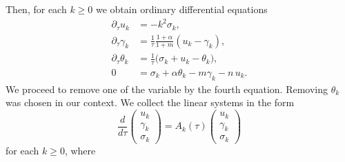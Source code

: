 \documentclass[a4paper,11pt]{article}
\theoremstyle{remark}
\begin{document}
Then, for each $k\ge0$ we obtain ordinary differential equations
\begin{equation} \label{eq:l-system}
 \begin{aligned}
  \partial_\tau u_k &= -k^2 \sigma_k,\\
  \partial_\tau\gamma_k &= \frac{1}{\tau}\frac{1+\alpha}{1+m}(u_k-\gamma_k),\\
  \partial_\tau\theta_k &= \frac{1}{\tau}\Big(\sigma_k+ u_k -\theta_k\Big),\\%
  0&=\sigma_k + \alpha\theta_k -m\gamma_k - n \, u_k .
 \end{aligned}
\end{equation}
We proceed to remove one of the variable by the fourth equation. Removing $\theta_k$ was chosen in our context. We collect the linear systems in the form 
\begin{equation}\label{eq:l-system2} \tag{$L_k$}
 \frac{d}{d\tau}\begin{pmatrix} u_k\\ \gamma_k \\ \sigma_k \end{pmatrix}
 = A_k(\tau) \begin{pmatrix} u_k\\ \gamma_k \\ \sigma_k \end{pmatrix}
\end{equation}
for each $k\ge0$, where
\end{document}
